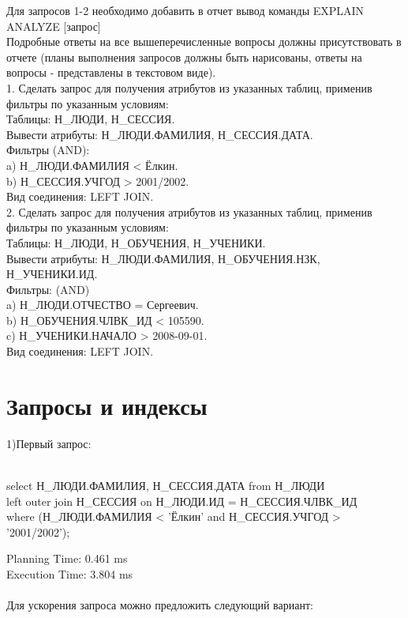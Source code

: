 \documentclass{article}
\begin{document}
Для запросов 1-2 необходимо добавить в отчет вывод команды EXPLAIN ANALYZE [запрос]
\\


Подробные ответы на все вышеперечисленные вопросы должны присутствовать в отчете (планы выполнения запросов должны быть нарисованы, ответы на вопросы - представлены в текстовом виде).
\\


1. Сделать запрос для получения атрибутов из указанных таблиц, применив фильтры по указанным условиям:\\
Таблицы: Н\_ЛЮДИ, Н\_СЕССИЯ.\\
Вывести атрибуты: Н\_ЛЮДИ.ФАМИЛИЯ, Н\_СЕССИЯ.ДАТА.\\
Фильтры (AND):\\
a) Н\_ЛЮДИ.ФАМИЛИЯ < Ёлкин.\\
b) Н\_СЕССИЯ.УЧГОД > 2001/2002.\\
Вид соединения: LEFT JOIN.\\


2. Сделать запрос для получения атрибутов из указанных таблиц, применив фильтры по указанным условиям:\\
Таблицы: Н\_ЛЮДИ, Н\_ОБУЧЕНИЯ, Н\_УЧЕНИКИ.\\
Вывести атрибуты: Н\_ЛЮДИ.ФАМИЛИЯ, Н\_ОБУЧЕНИЯ.НЗК, Н\_УЧЕНИКИ.ИД.\\
Фильтры: (AND)\\
a) Н\_ЛЮДИ.ОТЧЕСТВО = Сергеевич.\\
b) Н\_ОБУЧЕНИЯ.ЧЛВК\_ИД < 105590.\\
c) Н\_УЧЕНИКИ.НАЧАЛО > 2008-09-01.\\
Вид соединения: LEFT JOIN.
\section{Запросы и индексы}
1)Первый запрос:\\
\\
\begin{center}
    select Н\_ЛЮДИ.ФАМИЛИЯ, Н\_СЕССИЯ.ДАТА from Н\_ЛЮДИ\\
left outer join Н\_СЕССИЯ on Н\_ЛЮДИ.ИД = Н\_СЕССИЯ.ЧЛВК\_ИД\\
where (Н\_ЛЮДИ.ФАМИЛИЯ < 'Ёлкин' and Н\_СЕССИЯ.УЧГОД > '2001/2002');
\end{center}
Planning Time: 0.461 ms\\
Execution Time: 3.804 ms\\
\\
Для ускорения запроса можно предложить следующий вариант:\\
\end{document}

